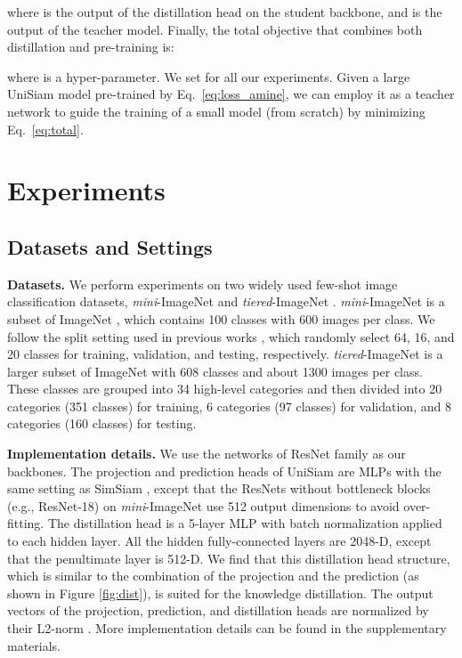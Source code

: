 \documentclass[runningheads]{llncs}
\begin{document}
\noindent where  is the output of the distillation head on the student backbone, and  is the output of the teacher model.
Finally, the total objective that combines both distillation and pre-training is:
\begin{footnotesize}

\end{footnotesize}


\noindent where  is a hyper-parameter. We set  for all our experiments. Given a large UniSiam model pre-trained by Eq.~\ref{eq:loss_amine}, we can employ it as a teacher network to guide the training of a small model (from scratch) by minimizing Eq.~\ref{eq:total}.









\section{Experiments}

\subsection{Datasets and Settings}
\noindent\textbf{Datasets.} We perform experiments on two widely used few-shot image classification datasets, \emph{mini}-ImageNet \cite{vinyals2016matching} and \emph{tiered}-ImageNet \cite{ren2018meta}. \emph{mini}-ImageNet \cite{vinyals2016matching} is a subset of ImageNet \cite{russakovsky2015imagenet}, which contains 100 classes with 600 images per class. We follow the split setting used in previous works \cite{ravi2017optimization}, which randomly select 64, 16, and 20 classes for training, validation, and testing, respectively. \emph{tiered}-ImageNet \cite{ren2018meta} is a larger subset of ImageNet with 608 classes and about 1300 images per class.  These classes are grouped into 34 high-level categories and then divided into 20 categories (351 classes) for training, 6 categories (97 classes) for validation, and 8 categories (160 classes) for testing. 

\noindent\textbf{Implementation details.} We use the networks of ResNet family \cite{he2016deep} as our backbones. The projection and prediction heads of UniSiam are MLPs with the same setting as SimSiam \cite{chen2020exploring}, except that the ResNets without bottleneck blocks (e.g., ResNet-18) on \emph{mini}-ImageNet use 512 output dimensions to avoid over-fitting. The distillation head is a 5-layer MLP with batch normalization applied to each hidden layer. 
All the hidden fully-connected layers are 2048-D, except that the penultimate layer is 512-D. 
We find that this distillation head structure, which is similar to the combination of the projection and the prediction (as shown in Figure \ref{fig:dist}), is suited for the knowledge distillation.  
The output vectors of the projection, prediction, and distillation heads are normalized by their L2-norm \cite{wu2018unsupervised}.
More implementation details can be found in the supplementary materials.
\end{document}
